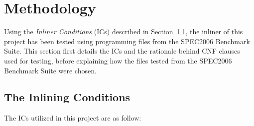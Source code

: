 
\clearpage
\section{Methodology}
\label{sec:methodology}

Using the \textit{Inliner Conditions} (ICs) described in
Section~\ref{sub:meth:inlining_conditions}, the inliner of this project has been
tested using  programming files from the SPEC2006 Benchmark Suite.
This section first details the ICs and the rationale behind CNF clauses used for
testing, before explaining how the files tested from the SPEC2006 Benchmark
Suite were chosen.

\subsection{The Inlining Conditions}
\label{sub:meth:inlining_conditions}

The ICs utilized in this project are as follow:

